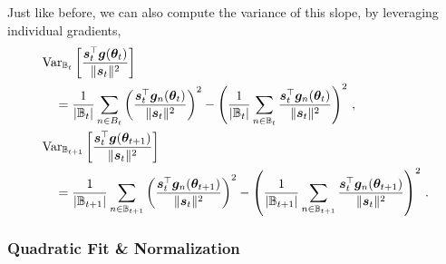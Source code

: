 Just like before, we can also compute the variance of this slope, by leveraging
individual gradients,
\begin{align*}
  &\mathrm{Var}_{{\mathbb{B}}_t} \left[\frac{{\bm{s}}_t^\top {\bm{g}}({\bm{\theta}}_t)}{\lVert {\bm{s}}_t
  \rVert^2}\right]
    \\
  &\quad=
     \frac{1}{|{\mathbb{B}}_t|} \sum_{n\in B_t} \left( \frac{{\bm{s}}_t^\top {\bm{g}}_n({\bm{\theta}}_t)}{\lVert
     {\bm{s}}_t \rVert^2} \right)^2
     -  \left( \frac{1}{|{\mathbb{B}}_t|} \sum_{n\in {\mathbb{B}}_t} \frac{{\bm{s}}_t^\top
     {\bm{g}}_n({\bm{\theta}}_t)}{\lVert {\bm{s}}_t \rVert^2} \right)^2 \, ,
  \\
  &\mathrm{Var}_{{\mathbb{B}}_{t+1}} \left[\frac{{\bm{s}}_t^\top {\bm{g}}({\bm{\theta}}_{t+1})}{\lVert {\bm{s}}_t
  \rVert^2}\right]
    \\
  &\quad=
     \frac{1}{|{\mathbb{B}}_{t+1}|} \sum_{n\in {\mathbb{B}}_{t+1}} \left( \frac{{\bm{s}}_t^\top {\bm{g}}_n({\bm{\theta}}_{t+1})}{\lVert
     {\bm{s}}_t \rVert^2} \right)^2
     -  \left( \frac{1}{|{\mathbb{B}}_{t+1}|} \sum_{n\in {\mathbb{B}}_{t+1}} \frac{{\bm{s}}_t^\top
     {\bm{g}}_n({\bm{\theta}}_{t+1})}{\lVert {\bm{s}}_t \rVert^2} \right)^2 \, .
\end{align*}

\subsubsection{Quadratic Fit \& Normalization}

